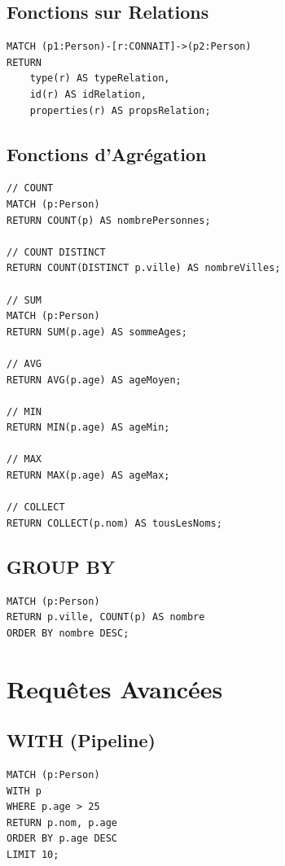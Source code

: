 \documentclass[11pt,a4paper]{article}
\begin{document}
\subsection{Fonctions sur Relations}

\begin{lstlisting}
MATCH (p1:Person)-[r:CONNAIT]->(p2:Person)
RETURN 
    type(r) AS typeRelation,
    id(r) AS idRelation,
    properties(r) AS propsRelation;
\end{lstlisting}

\subsection{Fonctions d'Agrégation}

\begin{lstlisting}
// COUNT
MATCH (p:Person)
RETURN COUNT(p) AS nombrePersonnes;

// COUNT DISTINCT
RETURN COUNT(DISTINCT p.ville) AS nombreVilles;

// SUM
MATCH (p:Person)
RETURN SUM(p.age) AS sommeAges;

// AVG
RETURN AVG(p.age) AS ageMoyen;

// MIN
RETURN MIN(p.age) AS ageMin;

// MAX
RETURN MAX(p.age) AS ageMax;

// COLLECT
RETURN COLLECT(p.nom) AS tousLesNoms;
\end{lstlisting}

\subsection{GROUP BY}

\begin{lstlisting}
MATCH (p:Person)
RETURN p.ville, COUNT(p) AS nombre
ORDER BY nombre DESC;
\end{lstlisting}

\newpage

\section{Requêtes Avancées}

\subsection{WITH (Pipeline)}

\begin{lstlisting}
MATCH (p:Person)
WITH p
WHERE p.age > 25
RETURN p.nom, p.age
ORDER BY p.age DESC
LIMIT 10;
\end{lstlisting}
\end{document}
